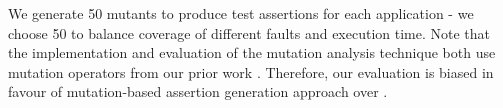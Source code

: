 We generate 50 mutants to produce test assertions for each application - we choose 50 to balance coverage of different faults and execution time. 
Note that the implementation and evaluation of the mutation analysis technique both use mutation operators from our prior work \cite{mirshokraie:tse15}. Therefore, our evaluation is biased in favour of mutation-based assertion generation approach over \tool.


 

